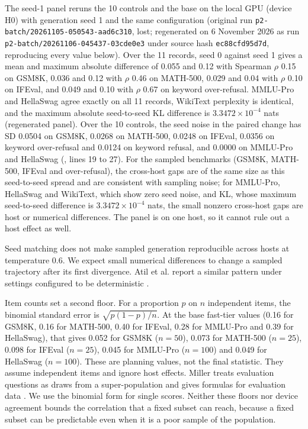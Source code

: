 The seed-1 panel reruns the 10 controls and the base on the local GPU (device H0) with generation seed 1 and the same configuration (original run \texttt{p2-batch/20261105-050543-aad6c310}, lost; regenerated on 6 November 2026 as run \texttt{p2-batch/20261106-045437-03cde0e3} under source hash \texttt{ec88cfd95d7d}, reproducing every value below). Over the 11 records, seed 0 against seed 1 gives a mean and maximum absolute difference of 0.055 and 0.12 with Spearman $\rho$ 0.15 on GSM8K, 0.036 and 0.12 with $\rho$ 0.46 on MATH-500, 0.029 and 0.04 with $\rho$ 0.10 on IFEval, and 0.049 and 0.10 with $\rho$ 0.67 on keyword over-refusal. MMLU-Pro and HellaSwag agree exactly on all 11 records, WikiText perplexity is identical, and the maximum absolute seed-to-seed KL difference is $3.3472\times10^{-4}$ nats (regenerated panel). Over the 10 controls, the seed noise in the paired change has SD 0.0504 on GSM8K, 0.0268 on MATH-500, 0.0248 on IFEval, 0.0356 on keyword over-refusal and 0.0124 on keyword refusal, and 0.0000 on MMLU-Pro and HellaSwag (, lines 19 to 27). For the sampled benchmarks (GSM8K, MATH-500, IFEval and over-refusal), the cross-host gaps are of the same size as this seed-to-seed spread and are consistent with sampling noise; for MMLU-Pro, HellaSwag and WikiText, which show zero seed noise, and KL, whose maximum seed-to-seed difference is $3.3472\times10^{-4}$ nats, the small nonzero cross-host gaps are host or numerical differences. The panel is on one host, so it cannot rule out a host effect as well.

Seed matching does not make sampled generation reproducible across hosts at temperature 0.6. We expect small numerical differences to change a sampled trajectory after its first divergence. Atil et al. report a similar pattern under settings configured to be deterministic \citep{atil2024nondeterminism}.

Item counts set a second floor. For a proportion $p$ on $n$ independent items, the binomial standard error is $\sqrt{p(1-p)/n}$. At the base fast-tier values (0.16 for GSM8K, 0.16 for MATH-500, 0.40 for IFEval, 0.28 for MMLU-Pro and 0.39 for HellaSwag), that gives 0.052 for GSM8K ($n = 50$), 0.073 for MATH-500 ($n = 25$), 0.098 for IFEval ($n = 25$), 0.045 for MMLU-Pro ($n = 100$) and 0.049 for HellaSwag ($n = 100$). These are planning values, not the final statistic. They assume independent items and ignore host effects. Miller treats evaluation questions as draws from a super-population and gives formulas for evaluation data \citep{miller2024error}. We use the binomial form for single scores. Neither these floors nor device agreement bounds the correlation that a fixed subset can reach, because a fixed subset can be predictable even when it is a poor sample of the population.

